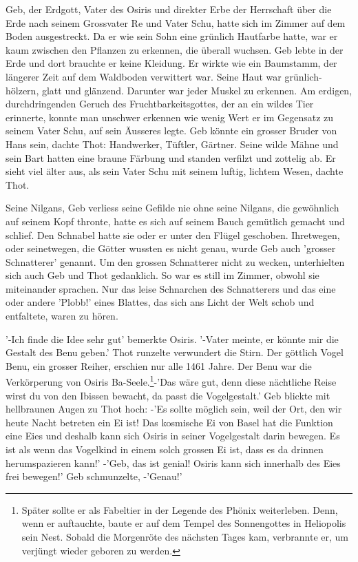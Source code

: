 \documentclass[11pt,titlepage,a5paper]{book}
\begin{document}
Geb, der Erdgott, Vater des Osiris und direkter Erbe der Herrschaft über die Erde nach seinem Grossvater Re und Vater Schu, hatte sich im Zimmer auf dem Boden ausgestreckt. Da er wie sein Sohn eine grünlich Hautfarbe hatte, war er kaum zwischen den Pflanzen zu erkennen, die überall wuchsen. Geb lebte in der Erde und dort brauchte er keine Kleidung. Er wirkte wie ein Baumstamm, der längerer Zeit auf dem Waldboden verwittert war. Seine Haut war grünlich-hölzern, glatt und glänzend. Darunter war jeder Muskel zu erkennen. Am erdigen, durchdringenden Geruch des Fruchtbarkeitsgottes, der an ein wildes Tier erinnerte, konnte man unschwer erkennen wie wenig Wert er im Gegensatz zu seinem Vater Schu, auf sein Äusseres legte. Geb könnte ein grosser Bruder von Hans sein, dachte Thot: Handwerker, Tüftler, Gärtner. Seine wilde Mähne und sein Bart hatten eine braune Färbung und standen verfilzt und zottelig ab. Er sieht viel älter aus, als sein Vater Schu mit seinem luftig, lichtem Wesen, dachte Thot.

Seine Nilgans, Geb verliess seine Gefilde nie ohne seine Nilgans, die gewöhnlich auf seinem Kopf thronte, hatte es sich auf seinem Bauch gemütlich gemacht und schlief. Den Schnabel hatte sie oder er unter den Flügel geschoben. Ihretwegen, oder seinetwegen, die Götter wussten es nicht genau, wurde Geb auch 'grosser Schnatterer' genannt. Um den grossen Schnatterer nicht zu wecken, unterhielten sich auch Geb und Thot gedanklich. So war es still im Zimmer, obwohl sie miteinander sprachen. Nur das leise Schnarchen des Schnatterers und das eine oder andere 'Plobb!' eines Blattes, das sich ans Licht der Welt schob und entfaltete, waren zu hören.

'-Ich finde die Idee sehr gut' bemerkte Osiris. '-Vater meinte, er könnte mir die Gestalt des Benu geben.' Thot runzelte verwundert die Stirn. Der göttlich Vogel Benu, ein grosser Reiher, erschien nur alle 1461 Jahre. Der Benu war die Verkörperung von Osiris Ba-Seele.\footnote{ Später sollte er als Fabeltier in der Legende des Phönix weiterleben. Denn, wenn er auftauchte, baute er auf dem Tempel des Sonnengottes in Heliopolis sein Nest. Sobald die Morgenröte des nächsten Tages kam, verbrannte er, um verjüngt wieder geboren zu werden.}-'Das wäre gut, denn diese nächtliche Reise wirst du von den Ibissen bewacht, da passt die  Vogelgestalt.' Geb blickte mit hellbraunen Augen zu Thot hoch: -'Es sollte möglich sein, weil der Ort, den wir heute Nacht betreten ein Ei ist! Das kosmische Ei von Basel hat die Funktion eine Eies und deshalb kann sich Osiris in seiner Vogelgestalt darin bewegen. Es ist als wenn das Vogelkind in einem solch grossen Ei ist, dass es da drinnen herumspazieren kann!' -'Geb, das ist genial! Osiris kann sich innerhalb des Eies frei bewegen!' Geb schmunzelte, -'Genau!' 
\end{document}
